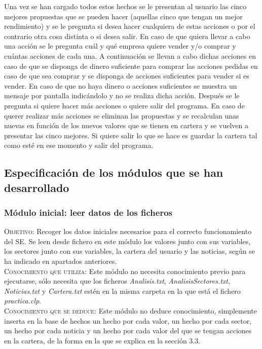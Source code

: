 \documentclass[12pt]{article}
\begin{document}
Una vez se han cargado todos estos hechos se le presentan al usuario las cinco mejores propuestas que se pueden hacer (aquellas cinco que tengan un mejor rendimiento) y se le pregunta si desea hacer cualquiera de estas acciones o por el contrario otra cosa distinta o si desea salir. En caso de que quiera llevar a cabo una acción se le pregunta cuál y qué empresa quiere vender y/o comprar y cuántas acciones de cada una. A continuación se llevan a cabo dichas acciones en caso de que se disponga de dinero suficiente para comprar las acciones pedidas en caso de que sea comprar y se disponga de acciones suficientes para vender si es vender. En caso de que no haya dinero o acciones suficientes se muestra un mensaje por pantalla indicándolo y no se realiza dicha acción. Después se le pregunta si quiere hacer más acciones o quiere salir del programa. En caso de querer realizar más acciones se eliminan las propuestas y se recalculan unas nuevas en función de los nuevos valores que se tienen en cartera y se vuelven a presentar las cinco mejores. Si quiere salir lo que se hace es guardar la cartera tal como esté en ese momento y salir del programa.

\subsection{Especificación de los módulos que se han desarrollado}
\subsubsection{Módulo inicial: leer datos de los ficheros}
\textsc{Objetivo}: Recoger los datos iniciales necesarios para el correcto funcionamiento del SE. Se leen desde fichero en este módulo los valores junto con sus variables, los sectores junto con sus variables, la cartera del usuario y las noticias, según se ha indicado en apartados anteriores.\\

\textsc{Conocimiento que utiliza}: Este módulo no necesita conocimiento previo para ejecutarse, sólo necesita que los ficheros \textit{Analisis.txt}, \textit{AnalisisSectores.txt}, \textit{Noticias.txt} y \textit{Cartera.txt} estén en la misma carpeta en la que está el fichero \textit{practica.clp}.\\

\textsc{Conocimiento que se deduce}: Este módulo no deduce conocimiento, simplemente inserta en la base de hechos un hecho por cada valor, un hecho por cada sector, un hecho por cada noticia y un hecho por cada valor del que se tengan acciones en la cartera, de la forma en la que se explica en la sección 3.3.
\end{document}
